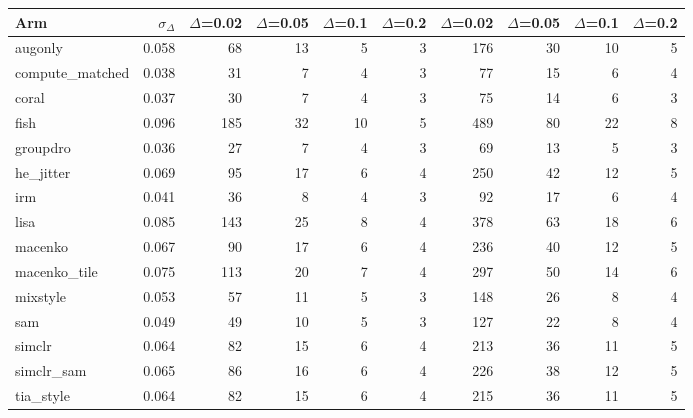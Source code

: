 \begin{tabular}{lrrrrrrrrr}
\toprule
Arm & $\sigma_\Delta$ & $\Delta$=0.02 & $\Delta$=0.05 & $\Delta$=0.1 & $\Delta$=0.2 & $\Delta$=0.02 & $\Delta$=0.05 & $\Delta$=0.1 & $\Delta$=0.2 \\
\midrule
augonly & 0.058 & 68 & 13 & 5 & 3 & 176 & 30 & 10 & 5 \\
compute\_matched & 0.038 & 31 & 7 & 4 & 3 & 77 & 15 & 6 & 4 \\
coral & 0.037 & 30 & 7 & 4 & 3 & 75 & 14 & 6 & 3 \\
fish & 0.096 & 185 & 32 & 10 & 5 & 489 & 80 & 22 & 8 \\
groupdro & 0.036 & 27 & 7 & 4 & 3 & 69 & 13 & 5 & 3 \\
he\_jitter & 0.069 & 95 & 17 & 6 & 4 & 250 & 42 & 12 & 5 \\
irm & 0.041 & 36 & 8 & 4 & 3 & 92 & 17 & 6 & 4 \\
lisa & 0.085 & 143 & 25 & 8 & 4 & 378 & 63 & 18 & 6 \\
macenko & 0.067 & 90 & 17 & 6 & 4 & 236 & 40 & 12 & 5 \\
macenko\_tile & 0.075 & 113 & 20 & 7 & 4 & 297 & 50 & 14 & 6 \\
mixstyle & 0.053 & 57 & 11 & 5 & 3 & 148 & 26 & 8 & 4 \\
sam & 0.049 & 49 & 10 & 5 & 3 & 127 & 22 & 8 & 4 \\
simclr & 0.064 & 82 & 15 & 6 & 4 & 213 & 36 & 11 & 5 \\
simclr\_sam & 0.065 & 86 & 16 & 6 & 4 & 226 & 38 & 12 & 5 \\
tia\_style & 0.064 & 82 & 15 & 6 & 4 & 215 & 36 & 11 & 5 \\
\bottomrule
\end{tabular}
